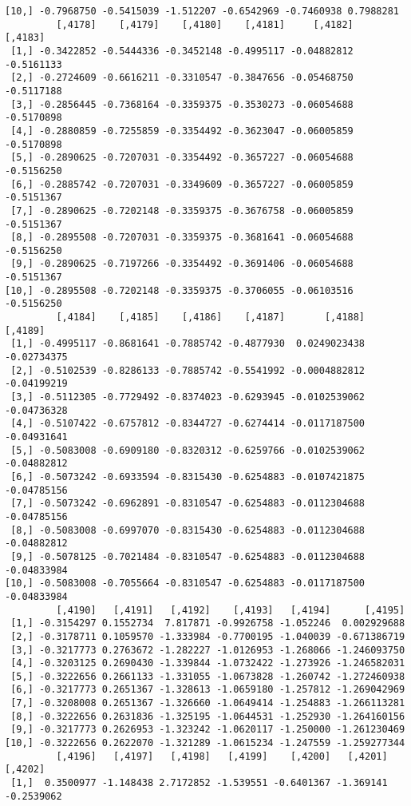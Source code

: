 \documentclass[
  letterpaper,
  DIV=11,
  numbers=noendperiod]{scrreprt}
\begin{document}
\begin{verbatim}
[10,] -0.7968750 -0.5415039 -1.512207 -0.6542969 -0.7460938 0.7988281
         [,4178]    [,4179]    [,4180]    [,4181]     [,4182]    [,4183]
 [1,] -0.3422852 -0.5444336 -0.3452148 -0.4995117 -0.04882812 -0.5161133
 [2,] -0.2724609 -0.6616211 -0.3310547 -0.3847656 -0.05468750 -0.5117188
 [3,] -0.2856445 -0.7368164 -0.3359375 -0.3530273 -0.06054688 -0.5170898
 [4,] -0.2880859 -0.7255859 -0.3354492 -0.3623047 -0.06005859 -0.5170898
 [5,] -0.2890625 -0.7207031 -0.3354492 -0.3657227 -0.06054688 -0.5156250
 [6,] -0.2885742 -0.7207031 -0.3349609 -0.3657227 -0.06005859 -0.5151367
 [7,] -0.2890625 -0.7202148 -0.3359375 -0.3676758 -0.06005859 -0.5151367
 [8,] -0.2895508 -0.7207031 -0.3359375 -0.3681641 -0.06054688 -0.5156250
 [9,] -0.2890625 -0.7197266 -0.3354492 -0.3691406 -0.06054688 -0.5151367
[10,] -0.2895508 -0.7202148 -0.3359375 -0.3706055 -0.06103516 -0.5156250
         [,4184]    [,4185]    [,4186]    [,4187]       [,4188]     [,4189]
 [1,] -0.4995117 -0.8681641 -0.7885742 -0.4877930  0.0249023438 -0.02734375
 [2,] -0.5102539 -0.8286133 -0.7885742 -0.5541992 -0.0004882812 -0.04199219
 [3,] -0.5112305 -0.7729492 -0.8374023 -0.6293945 -0.0102539062 -0.04736328
 [4,] -0.5107422 -0.6757812 -0.8344727 -0.6274414 -0.0117187500 -0.04931641
 [5,] -0.5083008 -0.6909180 -0.8320312 -0.6259766 -0.0102539062 -0.04882812
 [6,] -0.5073242 -0.6933594 -0.8315430 -0.6254883 -0.0107421875 -0.04785156
 [7,] -0.5073242 -0.6962891 -0.8310547 -0.6254883 -0.0112304688 -0.04785156
 [8,] -0.5083008 -0.6997070 -0.8315430 -0.6254883 -0.0112304688 -0.04882812
 [9,] -0.5078125 -0.7021484 -0.8310547 -0.6254883 -0.0112304688 -0.04833984
[10,] -0.5083008 -0.7055664 -0.8310547 -0.6254883 -0.0117187500 -0.04833984
         [,4190]   [,4191]   [,4192]    [,4193]   [,4194]      [,4195]
 [1,] -0.3154297 0.1552734  7.817871 -0.9926758 -1.052246  0.002929688
 [2,] -0.3178711 0.1059570 -1.333984 -0.7700195 -1.040039 -0.671386719
 [3,] -0.3217773 0.2763672 -1.282227 -1.0126953 -1.268066 -1.246093750
 [4,] -0.3203125 0.2690430 -1.339844 -1.0732422 -1.273926 -1.246582031
 [5,] -0.3222656 0.2661133 -1.331055 -1.0673828 -1.260742 -1.272460938
 [6,] -0.3217773 0.2651367 -1.328613 -1.0659180 -1.257812 -1.269042969
 [7,] -0.3208008 0.2651367 -1.326660 -1.0649414 -1.254883 -1.266113281
 [8,] -0.3222656 0.2631836 -1.325195 -1.0644531 -1.252930 -1.264160156
 [9,] -0.3217773 0.2626953 -1.323242 -1.0620117 -1.250000 -1.261230469
[10,] -0.3222656 0.2622070 -1.321289 -1.0615234 -1.247559 -1.259277344
         [,4196]   [,4197]   [,4198]   [,4199]    [,4200]   [,4201]    [,4202]
 [1,]  0.3500977 -1.148438 2.7172852 -1.539551 -0.6401367 -1.369141 -0.2539062

\end{verbatim}
\end{document}
